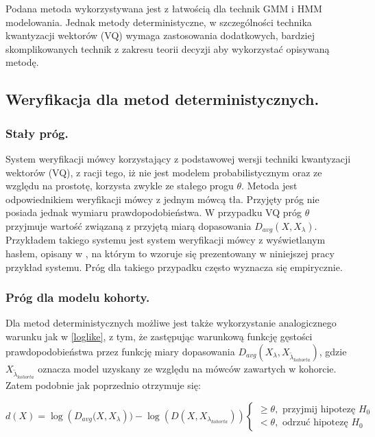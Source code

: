 Podana metoda wykorzystywana jest z łatwością dla technik GMM i HMM modelowania. Jednak metody deterministyczne, w szczególności technika kwantyzacji wektorów (VQ) wymaga zastosowania dodatkowych, bardziej skomplikowanych technik z zakresu teorii decyzji aby wykorzystać opisywaną metodę. 

\subsection{Weryfikacja dla metod deterministycznych.}
\subsubsection{Stały próg.}
System weryfikacji mówcy korzystający z podstawowej wersji techniki kwantyzacji wektorów (VQ), z racji tego, iż nie jest modelem probabilistycznym oraz ze względu na prostotę, korzysta zwykle ze stałego progu $\theta$. Metoda jest odpowiednikiem weryfikacji mówcy z jednym mówcą tła. Przyjęty próg nie posiada jednak wymiaru prawdopodobieństwa. W przypadku VQ próg $\theta$ przyjmuje wartość związaną z przyjętą miarą dopasowania $D_{avg}(X, X_{\lambda})$. Przykładem takiego systemu jest system weryfikacji mówcy z wyświetlanym hasłem, opisany w \cite{10digits92}, na którym to wzoruje się prezentowany w niniejszej pracy przykład systemu. Próg dla takiego przypadku często wyznacza się empirycznie. 

\subsubsection{Próg dla modelu kohorty.}
Dla metod deterministycznych możliwe jest także wykorzystanie analogicznego warunku jak w \ref{loglike}, z tym, że zastępując warunkową funkcję gęstości prawdopodobieństwa przez funkcję miary dopasowania $D_{avg}(X_{\lambda}, X_{\tilde{\lambda}_{kohorta}})$, gdzie $X_{\tilde{\lambda}_{kohorta}}$ oznacza model uzyskany ze względu na mówców zawartych w kohorcie. Zatem podobnie jak poprzednio otrzymuje się:

\begin{equation}
  \label{loglikedis}
  d(X)= \log({D_{avg} (X, X_{\lambda}})) - \log(D(X, X_{\lambda_{kohorta}}))
  \begin{cases}
    \ge \theta, \textrm{ przyjmij hipotezę } H_0 \\
    < \theta, \textrm{ odrzuć hipotezę } H_0
  \end{cases}
\end{equation}

